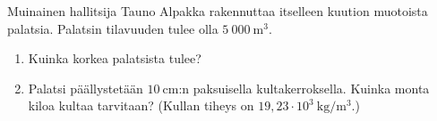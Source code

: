 \begin{tehtava}
Muinainen hallitsija Tauno Alpakka rakennuttaa itselleen kuution muotoista palatsia.  Palatsin tilavuuden tulee olla $5~000~\mathrm{m}^3$. 
\begin{enumerate}
\item Kuinka korkea palatsista tulee?
\item Palatsi päällystetään $10~\mathrm{cm}$:n paksuisella kultakerroksella.  Kuinka monta kiloa kultaa tarvitaan? (Kullan tiheys on $19,23 \cdot 10^3~\mathrm{ kg}/\mathrm{m}^3$.) 
\end{enumerate}
\end{tehtava}

